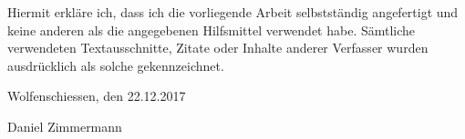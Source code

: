 \thispagestyle{Preinhalt}

Hiermit erkläre ich, dass ich die vorliegende Arbeit selbstständig angefertigt und keine anderen als die
angegebenen Hilfsmittel verwendet habe. Sämtliche verwendeten Textausschnitte, Zitate oder Inhalte anderer
Verfasser wurden ausdrücklich als solche gekennzeichnet.

\vskip 1cm


Wolfenschiessen, den 22.12.2017

\vskip 1.5cm

Daniel Zimmermann